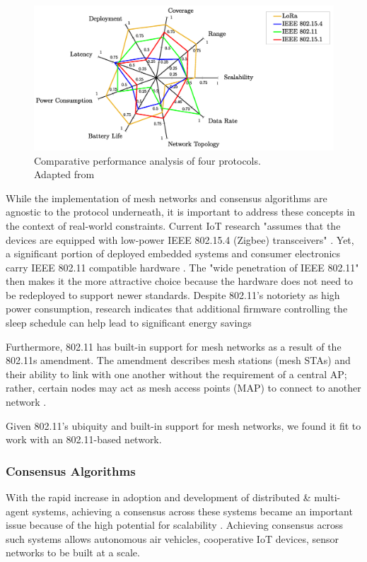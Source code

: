\begin{figure}[H]
    \centering
    \includegraphics[width=0.65\columnwidth]{final-proposal/images/comp_perf_analysis.png}
    \caption{Comparative performance analysis of four protocols. \\ Adapted from \cite{iot_survey_cilfone2019wireless}}
    \label{fig:comparison_protocols}
\end{figure}


While the implementation of mesh networks and consensus algorithms are agnostic to the protocol underneath, it is important to address these concepts in the context of real-world constraints. Current IoT research "assumes that the devices are equipped with low-power IEEE 802.15.4 (Zigbee) transceivers" \cite{disney_glaropoulos2013enhanced}. Yet, a significant portion of deployed embedded systems and consumer electronics carry IEEE 802.11 compatible hardware \cite{disney_glaropoulos2013enhanced}. 
The "wide penetration of IEEE 802.11" \cite{disney_glaropoulos2013enhanced} then makes it the more attractive choice because the hardware does not need to be redeployed to support newer standards. Despite 802.11's notoriety as high power consumption, research indicates that additional firmware controlling the sleep schedule can help lead to significant energy savings \cite{disney_glaropoulos2013enhanced, barghi2019practicalpower}

Furthermore, 802.11 has built-in support for mesh networks as a result of the 802.11s amendment. The amendment describes mesh stations (mesh STAs) and their ability to link with one another without the requirement of a central AP; rather, certain nodes may act as mesh access points (MAP) to connect to another network \cite{iov_wu2016internet, optical_zeitgeist_laboratory_2011}.

Given 802.11's ubiquity and built-in support for mesh networks, we found it fit to work with an 802.11-based network.

\subsubsection{Consensus Algorithms}
\label{conceptualization_consensus}
With the rapid increase in adoption and development of distributed \& multi-agent systems, achieving a consensus across these systems became an important issue because of the high potential for scalability \cite{Ge_Han_Ding_Zhang_Ning_2018}. Achieving consensus across such systems allows autonomous air vehicles, cooperative IoT devices, sensor networks to be built at a scale. 

